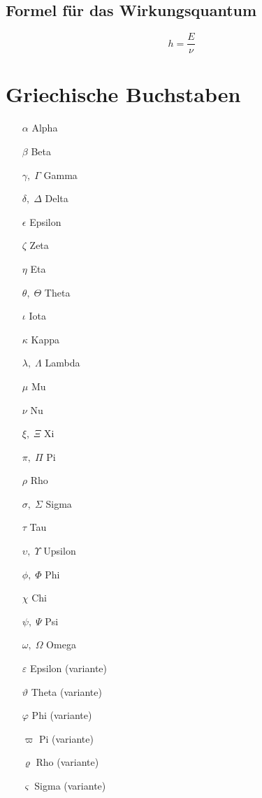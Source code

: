 \documentclass{article}
\begin{document}
\subsection{Formel für das Wirkungsquantum}
\begin{equation}
    h = \frac{E}{\nu}
\end{equation}


\section{Griechische Buchstaben}

\begin{itemize}
    \item[$\alpha$] Alpha
    \item[$\beta$] Beta
    \item[$\gamma,\;\Gamma$] Gamma
    \item[$\delta,\;\Delta$] Delta
    \item[$\epsilon$] Epsilon
    \item[$\zeta$] Zeta
    \item[$\eta$] Eta
    \item[$\theta,\;\Theta$] Theta
    \item[$\iota$] Iota
    \item[$\kappa$] Kappa
    \item[$\lambda,\;\Lambda$] Lambda
    \item[$\mu$] Mu
    \item[$\nu$] Nu
    \item[$\xi,\;\Xi$] Xi
    \item[$\pi,\;\Pi$] Pi
    \item[$\rho$] Rho
    \item[$\sigma,\;\Sigma$] Sigma
    \item[$\tau$] Tau
    \item[$\upsilon,\;\Upsilon$] Upsilon
    \item[$\phi,\;\Phi$] Phi
    \item[$\chi$] Chi
    \item[$\psi,\;\Psi$] Psi
    \item[$\omega,\;\Omega$] Omega
    \item[$\varepsilon$] Epsilon (variante)
    \item[$\vartheta$] Theta (variante)
    \item[$\varphi$] Phi (variante)
    \item[$\varpi$] Pi (variante)
    \item[$\varrho$] Rho (variante)
    \item[$\varsigma$] Sigma (variante)
\end{itemize}
\end{document}
